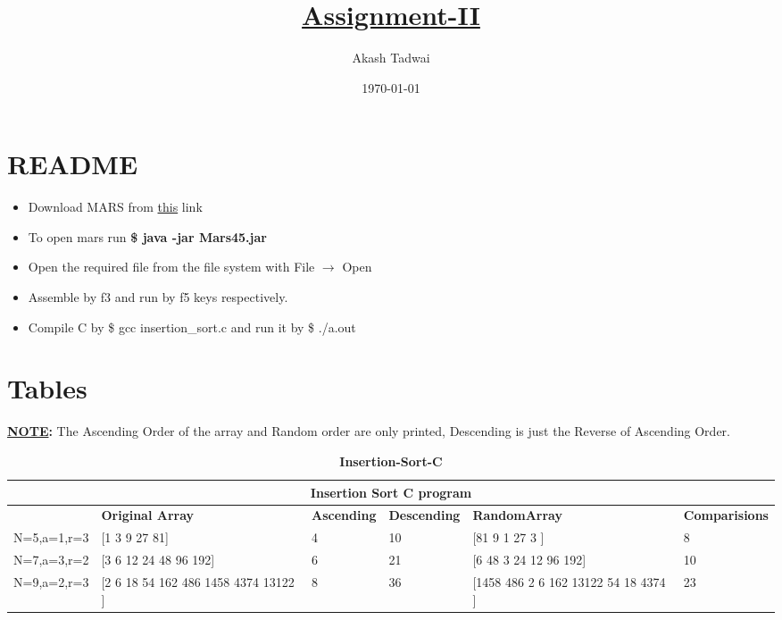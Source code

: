 \documentclass[english,a4paper,12pt]{article}
\title{\textbf{\underline{\Huge{Assignment-II }}}}
\author{Akash Tadwai}
\date{\today}
\begin{document}
\maketitle

\section{README} 
\begin{itemize}
    \item Download MARS from \href{https://courses.missouristate.edu/KenVollmar/MARS/download.htm}{\color{blue}this} link
    \item To open mars run \textbf{\$ java -jar Mars45.jar}
    \item Open the required file from the file system with File $\rightarrow$ Open
    \item Assemble by f3 and run by f5 keys respectively. 
    \item Compile C by \$ gcc insertion\_sort.c and run it by \$ ./a.out
\end{itemize}

\section{Tables}  
\textbullet \textbf{ \underline{NOTE}:} The Ascending Order of the array and Random order are only printed, Descending is just the Reverse of Ascending Order. 
\begin{table}[h!]
    \centering
    \begin{adjustbox}{width=1\textwidth}
    \begin{tabular}{| m{3cm} | m{5cm}| m{2cm}| m{3cm}|m{5cm}|m{3cm}|}
    \hline  
     \multicolumn{6}{|c|}{\textbf{Insertion Sort C program}} \\
     \hline
     &  \textbf{Original Array} & \textbf{Ascending }  & \textbf{Descending } &   \textbf{RandomArray} & \textbf{Comparisions}\\ 
 \hline
 N=5,a=1,r=3 &  [1 3 9 27 81] & 4 & 10 & [81 9 1 27 3 ] & 8 \\
 \hline 
 N=7,a=3,r=2 & [3 6 12 24 48 96 192]& 6 & 21 & [6 48 3 24 12 96 192]& 10\\
 \hline 
 N=9,a=2,r=3 & [2 6 18 54 162 486 1458 4374 13122 ]&8 & 36 &[1458 486 2 6 162 13122 54 18 4374 ]& 23 \\
 \hline 

    \end{tabular}
    \end{adjustbox}
    \caption{\textbf{Insertion-Sort-C}}
    \label{Insertion-Sort-C}
\end{table}
\end{document}
